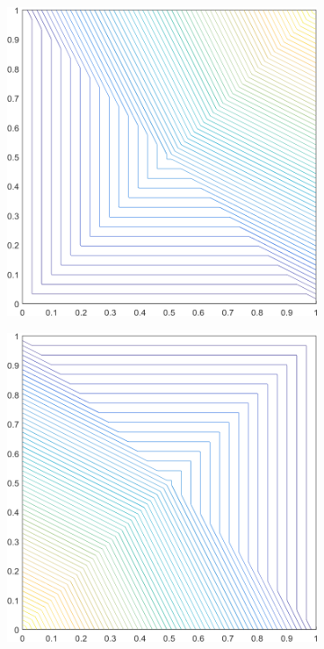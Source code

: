 \begin{figure}
\begin{subfigure}[b]{0.39\textwidth}
		\includegraphics[width=\textwidth]{figures/sec_BF/square_PWLD1_contour_b3.png}
		\caption{}
	\end{subfigure}
	\vfill
	\begin{subfigure}[b]{0.39\textwidth}
		\centering
		\includegraphics[width=\textwidth]{figures/sec_BF/square_PWLD1_contour_b1.png}

\end{subfigure}
\end{figure}
